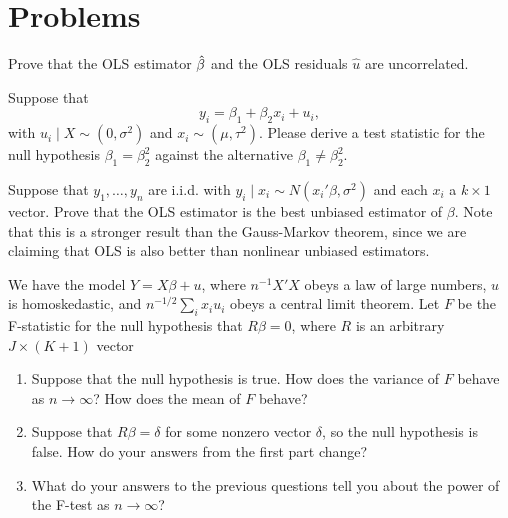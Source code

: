 

\chapter{Problems}

\begin{hw}
  Prove that the OLS estimator $\hat{\beta}$ and the OLS residuals $\hat u$
  are uncorrelated.
\end{hw}

\begin{hw}
  Suppose that
  \begin{equation}
    y_i = \beta_1 + \beta_2 x_i + u_i,
  \end{equation}
  with $u_i \mid X \sim (0, \sigma^2)$ and $x_i \sim (\mu,\tau^2)$.
  Please derive a test statistic for the null hypothesis $\beta_1 =
  \beta_2^2$ against the alternative $\beta_1 \neq \beta_2^2$.
\end{hw}

\begin{hw}
  Suppose that $y_1,\dots,y_n$ are i.i.d. with $y_i \mid x_i \sim
  N(x_i'\beta, \sigma^2)$ and each $x_i$ a $k \times 1$ vector. Prove
  that the OLS estimator is the best unbiased estimator of $\beta$.
  Note that this is a stronger result than the Gauss-Markov theorem,
  since we are claiming that OLS is also better than nonlinear
  unbiased estimators.
\end{hw}

\begin{hw}
  We have the model $Y = X\beta + u$, where $n^{-1} X'X$ obeys a law
  of large numbers, $u$ is homoskedastic, and $n^{-1/2} \sum_i x_i
  u_i$ obeys a central limit theorem. Let $F$ be the F-statistic for
  the null hypothesis that $R\beta = 0$, where $R$ is an arbitrary $J
  \times (K + 1)$ vector
  \begin{enumerate}
  \item Suppose that the null hypothesis is true. How does the
    variance of $F$ behave as $n \to \infty$? How does the mean of
    $F$ behave?
  \item Suppose that $R\beta = \delta$ for some nonzero vector
    $\delta$, so the null hypothesis is false. How do your answers
    from the first part change?
  \item What do your answers to the previous questions tell you about
    the power of the F-test as $n \to \infty$?
  \end{enumerate}
\end{hw}

